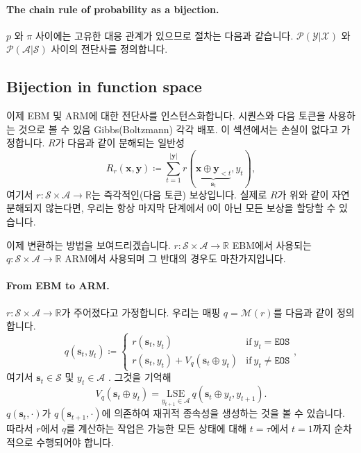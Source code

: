 \documentclass{article}
\def\s{{\bm{s}}}
\def\x{{\bm{x}}}
\def\y{{\bm{y}}}
\def\RR{{\mathbb{R}}}
\def\cA{{\mathcal{A}}}
\def\cM{{\mathcal{M}}}
\def\cP{{\mathcal{P}}}
\def\cS{{\mathcal{S}}}
\def\cX{{\mathcal{X}}}
\def\cY{{\mathcal{Y}}}
\newcommand{\Rsub}[1]{R_{#1}}
\def\lse{{\mathrm{LSE}}}
\def\eos{\texttt{EOS}\xspace}
\def\augvoc{\cA}
\begin{document}
\paragraph{The chain rule of probability as a bijection.}

$p$ 와 $\pi$ 사이에는 고유한 대응 관계가 있으므로 절차는 다음과 같습니다.
$\cP(\cY|\cX)$ 와 $\cP(\cA|\cS)$ 사이의 전단사를 정의합니다.

\subsection{Bijection in function space} 
 \label{sec:bijection}

이제 EBM 및 ARM에 대한 전단사를 인스턴스화합니다.
시퀀스와 다음 토큰을 사용하는 것으로 볼 수 있음 Gibbs(Boltzmann)
각각 배포. 이 섹션에서는 손실이 없다고 가정합니다.
$R$가 다음과 같이 분해되는 일반성
 \begin{equation} 
 \Rsub{r} ( \x , \y ) \coloneqq \sum _{t=1}^{| \y |} r( \underbrace { \x \oplus \y _{<t}}_{ \s _t}, y_t),
 \label{eq:R_decomposition} 
 \end{equation} 
여기서 $r \colon \cS \times \augvoc \to \RR$는 즉각적인(다음 토큰) 보상입니다.
실제로 $R$가 위와 같이 자연 분해되지 않는다면,
우리는 항상 마지막 단계에서 0이 아닌 모든 보상을 할당할 수 있습니다.

이제 변환하는 방법을 보여드리겠습니다. 
 $r \colon \cS \times \augvoc \to \RR$ 
EBM에서 사용되는
 $q \colon \cS \times \augvoc \to \RR$ 
ARM에서 사용되며 그 반대의 경우도 마찬가지입니다.

\paragraph{From EBM to ARM.}

$r \colon \cS \times \augvoc \to \RR$가 주어졌다고 가정합니다. 
우리는 매핑 $q = \cM(r)$를 다음과 같이 정의합니다.
 \begin{equation} 
q( \s _t, y_t) \coloneqq 
 \begin{cases} 
r( \s _t, y_t) & \mbox{if} ~ y_t = \eos \\
r( \s _t, y_t) + V_q( \s _t \oplus y_t) & \mbox{if} ~ y_t \neq \eos 
 \end{cases},
 \label{eq:q_from_r} 
 \end{equation} 
여기서 $\s_t \in \cS$ 및 $y_t \in \augvoc$ .
그것을 기억해
 \begin{equation} 
V_q( \s _t \oplus y_t) = \underset {y_{t+1} \in \augvoc }{ \lse } ~ q( \s _t \oplus y_t, y_{t+1}). 
 \end{equation} 
$q(\s_t, \cdot)$가 $q(\s_{t+1}, \cdot)$에 의존하여 재귀적 종속성을 생성하는 것을 볼 수 있습니다.
따라서 $r$에서 $q$를 계산하는 작업은 가능한 모든 상태에 대해 $t=\tau$에서 $t=1$까지 순차적으로 수행되어야 합니다.
\end{document}
